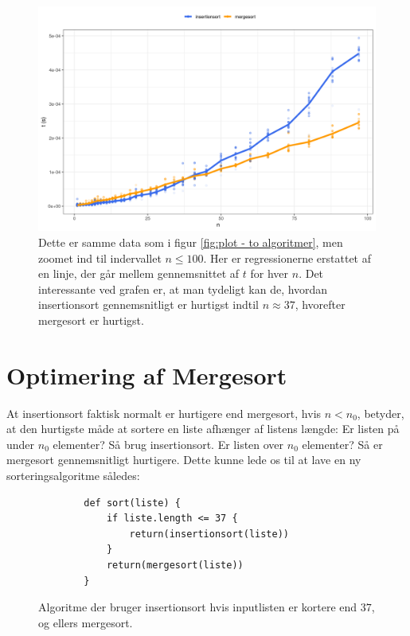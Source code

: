 \begin{figure}
	\begin{center}
		\includegraphics[scale=0.6]{../img/toAlgoritmerZoomedGns.png}
	\end{center}
	\caption{Dette er samme data som i figur \ref{fig:plot - to algoritmer}, men zoomet ind til indervallet $n \leq 100$. Her er regressionerne erstattet af en linje, der går mellem gennemsnittet af $t$ for hver $n$. Det interessante ved grafen er, at man tydeligt kan de, hvordan insertionsort gennemsnitligt er hurtigst indtil $n \approx 37$, hvorefter mergesort er hurtigst.}
	\label{fig:toAlgoritmerZoomedGns}
\end{figure}

\section{Optimering af Mergesort}%
\label{sub:Optimering af Mergesort}

At insertionsort faktisk normalt er hurtigere end mergesort, hvis $n < n_0$, betyder, at den hurtigste måde at sortere en liste afhænger af listens længde: Er listen på under $n_0$ elementer? Så brug insertionsort. Er listen over $n_0$ elementer? Så er mergesort gennemsnitligt hurtigere. Dette kunne lede os til at lave en ny sorteringsalgoritme således:

\begin{figure}[h]
	\begin{center}
		\begin{lstlisting}
		def sort(liste) {
			if liste.length <= 37 {
				return(insertionsort(liste))
			}
			return(mergesort(liste))
		}
		\end{lstlisting}
	\end{center}
	\vspace{-6mm}
	\caption{Algoritme der bruger insertionsort hvis inputlisten er kortere end $37$, og ellers mergesort.}
	\label{fig:hybridalgoritme}
\end{figure}


